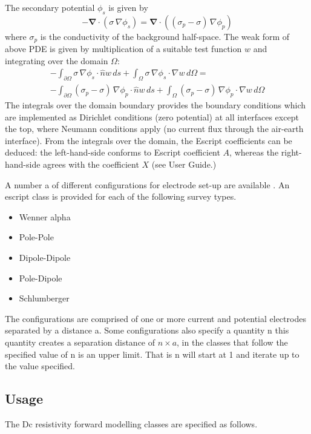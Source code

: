 The secondary potential $\phi_s$ is given by
\begin{equation}\label{ref:dcres:eq4}
-\mathbf{\nabla}\cdot\left(\sigma\,\nabla \phi_s \right)  = 
 \mathbf{\nabla}\cdot\left( \left(\sigma_p-\sigma\right)\,\nabla \phi_p  \right)
\end{equation} 
where $\sigma_p$ is the conductivity of the background half-space.
The weak form of above PDE is given by multiplication of a suitable test function $w$ and integrating over the domain $\Omega$:
\begin{multline}\label{ref:dcres:eq5}
-\int_{\partial\Omega} \sigma\,\nabla \phi_s  \cdot \hat{n} w\,ds +
 \int_{\Omega} \sigma\,\nabla \phi_s  \cdot \nabla w\,d\Omega =\\
-\int_{\partial\Omega} \left(\sigma_p-\sigma\right)\,\nabla \phi_p  
\cdot \hat{n} w\,ds + \int_{\Omega} \left(\sigma_p-\sigma\right)\,\nabla \phi_p  \cdot \nabla w\,d\Omega 
\end{multline}
The integrals over the domain boundary provides the boundary conditions which are
implemented as Dirichlet conditions (zero potential) at all interfaces except the
top, where Neumann conditions apply (no current flux through the air-earth interface).
From the integrals over the domain, the Escript coefficients can be deduced: the 
left-hand-side conforms to Escript coefficient $A$, whereas the right-hand-side agrees
with the coefficient $X$ (see User Guide.)

A number a of different configurations for electrode set-up are available \cite[pg 5]{LOKE2014}.
An escript class is provided for each of the following survey types.
\begin{itemize}
\item Wenner alpha
\item Pole-Pole
\item Dipole-Dipole
\item Pole-Dipole
\item Schlumberger
\end{itemize}
The configurations are comprised of one or more current and potential electrodes
separated by a distance a. Some configurations also specify a quantity n this 
quantity creates a separation distance of $n \times a$, in the classes that follow
the specified value of n is an upper limit. That is n will start at 1 and iterate
up to the value specified.

\subsection{Usage}
The Dc resistivity forward modelling classes are specified as follows.

